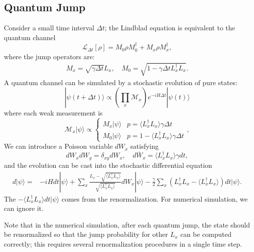 \documentclass{SciPost}
\begin{document}
\subsection{Quantum Jump}
Consider a small time interval $\Delta t$; the Lindblad equation is equivalent to the quantum channel 
\begin{equation}
	\mathcal{L}_{\Delta t}[\rho] = M_0 \rho M_0^\dagger + M_x \rho M_x^\dagger,
\end{equation}
where the jump operators are:
\begin{equation}
\begin{aligned}
	M_x = \sqrt{\gamma\Delta t} L_x, \quad
	M_0 = \sqrt{1 - \gamma \Delta t L_x^\dagger L_x}.
\end{aligned}
\end{equation}
A quantum channel can be simulated by a stochastic evolution of pure states:
\begin{equation}
	|\psi(t+\Delta t)\rangle \propto \left(\prod_{x} \mathcal{M}_x\right) e^{-i H\Delta t}|\psi(t)\rangle
\end{equation}
where each weak measurement is
\begin{equation}
	\mathcal{M}_x|\psi\rangle \propto \begin{cases}
		M_x |\psi\rangle & p = \langle L_x^\dagger L_x\rangle \gamma\Delta t \\
		M_0 |\psi\rangle & p = 1-\langle L_x^\dagger L_x\rangle \gamma\Delta t
	\end{cases},
\end{equation}
We can introduce a Poisson variable $dW_x$ satisfying 
\begin{equation}
	dW_x dW_y = \delta_{xy} dW_x,\quad \overline{dW_x} = \langle L_x^\dagger L_x\rangle\gamma dt,
\end{equation}
and the evolution can be cast into the stochastic differential equation
\begin{equation}
\begin{aligned}
	d|\psi\rangle = & -iHdt |\psi\rangle + \sum_x \frac{L_x-\sqrt{\langle L_x^\dagger L_x\rangle}}{\sqrt{\langle L_x^\dagger L_x\rangle}}dW_x|\psi\rangle - \frac{\gamma}{2} \sum_x \left(L_x^\dagger L_x-\langle L_x^\dagger L_x\rangle\right)dt 
	  |\psi\rangle.
\end{aligned}
\end{equation}
The $-\langle L_x^\dagger L_x\rangle dt |\psi\rangle$ comes from the renormalization. 
For numerical simulation, we can ignore it.

Note that in the numerical simulation, after each quantum jump, the state should be renormalized so that the jump probability for other $L_x$ can be computed correctly; this requires several renormalization procedures in a single time step. 
\end{document}
